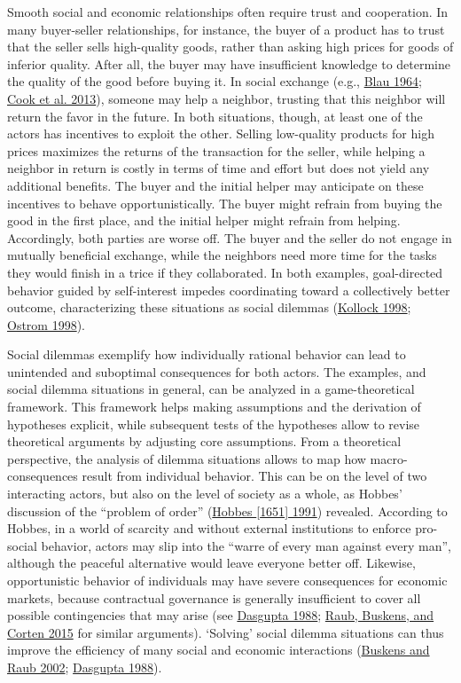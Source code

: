\documentclass[
  11pt,
]{article}
\begin{document}
Smooth social and economic relationships often require trust and cooperation.
In many buyer-seller relationships, for instance, the buyer of a product has to trust that the seller sells high-quality goods, rather than asking high prices for goods of inferior quality.
After all, the buyer may have insufficient knowledge to determine the quality of the good before buying it.
In social exchange (e.g., \protect\hyperlink{ref-blau1964exchange}{Blau 1964}; \protect\hyperlink{ref-Cook2013}{Cook et al. 2013}), someone may help a neighbor, trusting that this neighbor will return the favor in the future.
In both situations, though, at least one of the actors has incentives to exploit the other.
Selling low-quality products for high prices maximizes the returns of the transaction for the seller, while helping a neighbor in return is costly in terms of time and effort but does not yield any additional benefits.
The buyer and the initial helper may anticipate on these incentives to behave opportunistically.
The buyer might refrain from buying the good in the first place, and the initial helper might refrain from helping.
Accordingly, both parties are worse off.
The buyer and the seller do not engage in mutually beneficial exchange, while the neighbors need more time for the tasks they would finish in a trice if they collaborated.
In both examples, goal-directed behavior guided by self-interest impedes coordinating toward a collectively better outcome, characterizing these situations as social dilemmas (\protect\hyperlink{ref-kollock_social_1998}{Kollock 1998}; \protect\hyperlink{ref-ostrom_behavioral_1998}{Ostrom 1998}).

Social dilemmas exemplify how individually rational behavior can lead to unintended and suboptimal consequences for both actors.
The examples, and social dilemma situations in general, can be analyzed in a game-theoretical framework.
This framework helps making assumptions and the derivation of hypotheses explicit, while subsequent tests of the hypotheses allow to revise theoretical arguments by adjusting core assumptions.
From a theoretical perspective, the analysis of dilemma situations allows to map how macro-consequences result from individual behavior.
This can be on the level of two interacting actors, but also on the level of society as a whole, as Hobbes' discussion of the ``problem of order'' (\protect\hyperlink{ref-hobbes_leviathan}{Hobbes {[}1651{]} 1991}) revealed.
According to Hobbes, in a world of scarcity and without external institutions to enforce pro-social behavior, actors may slip into the ``warre of every man against every man'', although the peaceful alternative would leave everyone better off.
Likewise, opportunistic behavior of individuals may have severe consequences for economic markets, because contractual governance is generally insufficient to cover all possible contingencies that may arise (see \protect\hyperlink{ref-dasgupta_1988}{Dasgupta 1988}; \protect\hyperlink{ref-raub_etal_social_2015}{Raub, Buskens, and Corten 2015} for similar arguments).
`Solving' social dilemma situations can thus improve the efficiency of many social and economic interactions (\protect\hyperlink{ref-buskens_raub_embedded_2002}{Buskens and Raub 2002}; \protect\hyperlink{ref-dasgupta_1988}{Dasgupta 1988}).
\end{document}
